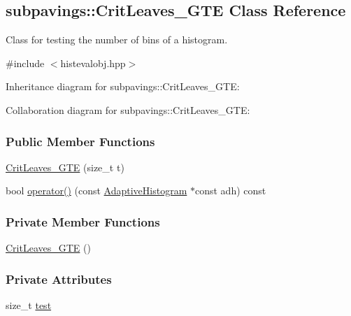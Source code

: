 \hypertarget{classsubpavings_1_1CritLeaves__GTE}{\subsection{subpavings\-:\-:\-Crit\-Leaves\-\_\-\-G\-T\-E \-Class \-Reference}
\label{classsubpavings_1_1CritLeaves__GTE}
}


\-Class for testing the number of bins of a histogram.  




{\ttfamily \#include $<$histevalobj.\-hpp$>$}



\-Inheritance diagram for subpavings\-:\-:\-Crit\-Leaves\-\_\-\-G\-T\-E\-:


\-Collaboration diagram for subpavings\-:\-:\-Crit\-Leaves\-\_\-\-G\-T\-E\-:
\subsubsection*{\-Public \-Member \-Functions}
\begin{DoxyCompactItemize}
\item 
\hyperlink{classsubpavings_1_1CritLeaves__GTE_a4aa02516f172964f8f87b944d8816245}{\-Crit\-Leaves\-\_\-\-G\-T\-E} (size\-\_\-t t)
\item 
bool \hyperlink{classsubpavings_1_1CritLeaves__GTE_a7427f4b81f72996bd756d9f22bc8c330}{operator()} (const \hyperlink{classsubpavings_1_1AdaptiveHistogram}{\-Adaptive\-Histogram} $\ast$const adh) const 
\end{DoxyCompactItemize}
\subsubsection*{\-Private \-Member \-Functions}
\begin{DoxyCompactItemize}
\item 
\hyperlink{classsubpavings_1_1CritLeaves__GTE_a72728974580f84bd105dab9d3d0f28e3}{\-Crit\-Leaves\-\_\-\-G\-T\-E} ()
\end{DoxyCompactItemize}
\subsubsection*{\-Private \-Attributes}
\begin{DoxyCompactItemize}
\item 
size\-\_\-t \hyperlink{classsubpavings_1_1CritLeaves__GTE_a74b86c92740d8f1d4d7a53338915a261}{test}
\end{DoxyCompactItemize}


